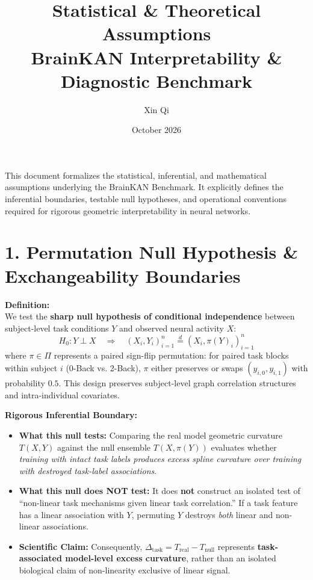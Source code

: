 \documentclass{article}
\title{Statistical \& Theoretical Assumptions \\ \large BrainKAN Interpretability \& Diagnostic Benchmark}
\author{Xin Qi}
\date{October 2026}
\begin{document}
\maketitle

This document formalizes the statistical, inferential, and mathematical assumptions underlying the BrainKAN Benchmark. It explicitly defines the inferential boundaries, testable null hypotheses, and operational conventions required for rigorous geometric interpretability in neural networks.

\section*{1. Permutation Null Hypothesis \& Exchangeability Boundaries}

\textbf{Definition:}\\
We test the \textbf{sharp null hypothesis of conditional independence} between subject-level task conditions $Y$ and observed neural activity $X$:
\begin{equation}
H_0: Y \perp X \quad \Longrightarrow \quad (X_i, Y_i)_{i=1}^n \overset{d}{=} (X_i, \pi(Y)_i)_{i=1}^n
\end{equation}
where $\pi \in \Pi$ represents a paired sign-flip permutation: for paired task blocks within subject $i$ (0-Back vs. 2-Back), $\pi$ either preserves or swaps $(y_{i,0}, y_{i,1})$ with probability $0.5$. This design preserves subject-level graph correlation structures and intra-individual covariates.

\textbf{Rigorous Inferential Boundary:}
\begin{itemize}
    \item \textbf{What this null tests:} Comparing the real model geometric curvature $T(X, Y)$ against the null ensemble $T(X, \pi(Y))$ evaluates whether \textit{training with intact task labels produces excess spline curvature over training with destroyed task-label associations}.
    \item \textbf{What this null does NOT test:} It does \textbf{not} construct an isolated test of ``non-linear task mechanisms given linear task correlation.'' If a task feature has a linear association with $Y$, permuting $Y$ destroys \textit{both} linear and non-linear associations.
    \item \textbf{Scientific Claim:} Consequently, $\Delta_{\mathrm{task}} = T_{\mathrm{real}} - T_{\mathrm{null}}$ represents \textbf{task-associated model-level excess curvature}, rather than an isolated biological claim of non-linearity exclusive of linear signal.
\end{itemize}
\end{document}
